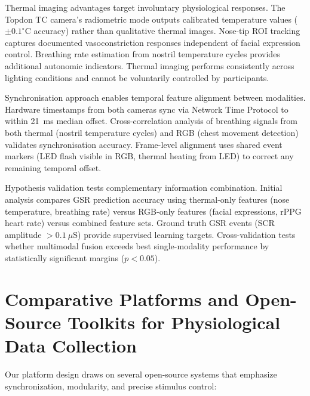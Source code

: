 \documentclass{report}
\begin{document}
Thermal imaging advantages target involuntary physiological responses. The Topdon TC camera's radiometric mode outputs calibrated temperature values ($\pm 0.1^{\circ}$C accuracy) rather than qualitative thermal images. Nose-tip ROI tracking captures documented vasoconstriction responses independent of facial expression control. Breathing rate estimation from nostril temperature cycles provides additional autonomic indicators. Thermal imaging performs consistently across lighting conditions and cannot be voluntarily controlled by participants.

Synchronisation approach enables temporal feature alignment between modalities. Hardware timestamps from both cameras sync via Network Time Protocol to within 21~ms median offset. Cross-correlation analysis of breathing signals from both thermal (nostril temperature cycles) and RGB (chest movement detection) validates synchronisation accuracy. Frame-level alignment uses shared event markers (LED flash visible in RGB, thermal heating from LED) to correct any remaining temporal offset.

Hypothesis validation tests complementary information combination. Initial analysis compares GSR prediction accuracy using thermal-only features (nose temperature, breathing rate) versus RGB-only features (facial expressions, rPPG heart rate) versus combined feature sets. Ground truth GSR events (SCR amplitude $>0.1~\mu$S) provide supervised learning targets. Cross-validation tests whether multimodal fusion exceeds best single-modality performance by statistically significant margins ($p < 0.05$).


\section{Comparative Platforms and Open-Source Toolkits for Physiological Data Collection}
\label{sec:platforms}

Our platform design draws on several open-source systems that emphasize synchronization, modularity, and precise stimulus control:
\end{document}
